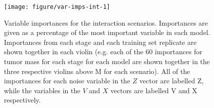 \documentclass[12pt]{article}
\begin{document}
\begin{figure}[!htbp]
\centering
\texttt{[image: figure/var-imps-int-1]}

\caption[Variable importances for interaction scenarios]{Variable importances for the interaction scenarios. Importances are given as a percentage of the most important variable in each model. Importances from each stage and each training set replicate are shown together in each violin (e.g. each of the 60 importances for tumor mass for each stage for each model are shown together in the three respective violins above M for each scenario). All of the importances for each noise variable in the $Z$ vector are labelled Z, while the variables in the $V$ and $X$ vectors are labelled V and X respectively.}\label{fig:var-imps-int}
\end{figure}
\end{document}
